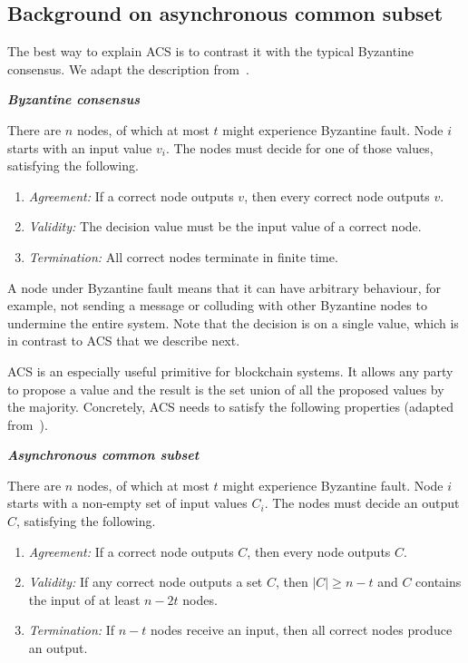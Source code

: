 \subsection{Background on asynchronous common subset}
\label{sec:acs-background}

The best way to explain ACS is to contrast it with the typical Byzantine consensus.
We adapt the description from~\cite[Chapter 17]{podc}.
\begin{definition}
\textbf{\emph{Byzantine consensus}}

There are $n$ nodes, of which at most $t$ might experience Byzantine fault.
Node $i$ starts with an input value $v_i$.
The nodes must decide for one of  those values, satisfying the following.
\begin{enumerate}
    \item \emph{Agreement:}
        If a correct node outputs $v$, then every correct node outputs $v$.
    \item \emph{Validity:}
        The decision value must be the input value of a correct node.
    \item \emph{Termination:}
        All correct nodes terminate in finite time.
\end{enumerate}
\end{definition}
A node under Byzantine fault means that it can have arbitrary behaviour,
for example, not sending a message or colluding with other Byzantine nodes to undermine the entire system.
Note that the decision is on a single value,
which is in contrast to ACS that we describe next.

ACS is an especially useful primitive for blockchain systems.
It allows any party to propose a value and the result is the set union of all the proposed values by the majority.
Concretely, ACS needs to satisfy the following properties (adapted from~\cite{miller2016honey}).
\begin{definition}
\label{def:acs}
\textbf{\emph{Asynchronous common subset}}

There are $n$ nodes, of which at most $t$ might experience Byzantine fault.
Node $i$ starts with a non-empty set of input values $C_i$.
The nodes must decide an output $C$, satisfying the following.
\begin{enumerate}
    \item \emph{Agreement:}
        If a correct node outputs $C$, then every node outputs $C$.
    \item \emph{Validity:}
        If any correct node outputs a set $C$,
        then $|C| \ge n - t$ and $C$ contains the input of at least $n - 2t$ nodes.
    \item \emph{Termination:}
        If $n - t$ nodes receive an input, then all correct nodes produce an output.
\end{enumerate}
\end{definition}

